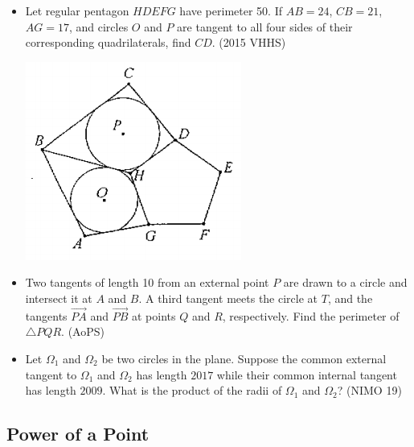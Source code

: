 \documentclass{article}
\begin{document}
\begin{itemize}

\item Let regular pentagon $HDEFG$ have perimeter 50. If $AB=24$, $CB=21$, $AG=17$, and circles $O$ and $P$ are tangent to all four sides of their corresponding quadrilaterals, find $CD$. (2015 VHHS)

\centerline{\includegraphics{2015VHHS2.PNG}}

\item Two tangents of length 10 from an external point $P$ are drawn to a circle and intersect it at $A$ and $B$.  A third tangent meets the circle at $T$, and the tangents $\overrightarrow{PA}$ and $\overrightarrow{PB}$ at points $Q$ and $R$, respectively. Find the perimeter of $\triangle PQR$. (AoPS)

\item Let $\Omega_1$ and $\Omega_2$ be two circles in the plane.  Suppose the common external tangent to $\Omega_1$ and $\Omega_2$ has length $2017$ while their common internal tangent has length $2009$.  What is the product of the radii of $\Omega_1$ and $\Omega_2$? (NIMO 19)




\end{itemize}


\subsection{Power of a Point}
\end{document}
